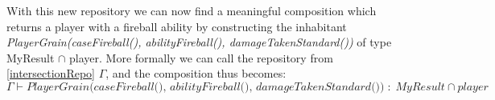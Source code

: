 With this new repository we can now find a meaningful composition which returns a player with a fireball ability by constructing the inhabitant \textit{PlayerGrain(caseFireball(), abilityFireball(), damageTakenStandard())} of type MyResult $\cap$ player. More formally we can call the repository from \autoref{intersectionRepo} $\Gamma$, and the composition thus becomes:
\begin{equation*}
	\Gamma \vdash \textit{PlayerGrain(caseFireball(), abilityFireball(), damageTakenStandard())}\; :\; \textit{MyResult}\cap \textit{player}
\end{equation*}

